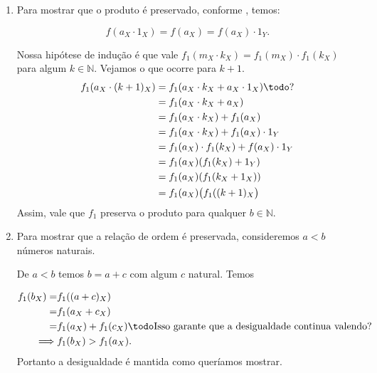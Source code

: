\documentclass[../main.tex]{subfiles}
\begin{document}
\begin{dem}
\begin{enumerate}
\begin{enumerate}
            \item
                Para mostrar que o produto é preservado, conforme , temos:
                
                \[ f(a_X \cdot 1_X) = f(a_X) = f(a_X) \cdot 1_Y. \]
        
                Nossa hipótese de indução é que vale $f_1(m_X \cdot k_X) = f_1(m_X) \cdot f_1(k_X)$ para algum $k \in \mathbb{N}$. Vejamos o que ocorre para $k+1$. \\
        
                \begin{align*}
                    f_1(a_X \cdot (k+1)_X)
                    &= f_1(a_X \cdot k_X + a_X \cdot 1_X) \todoAlign{?} \\
                    &= f_1(a_X \cdot k_X + a_X) \\
                    &= f_1(a_X \cdot k_X) + f_1(a_X) \\
                    &= f_1(a_X \cdot k_X) + f_1(a_X) \cdot 1_Y \\
                    &= f_1(a_X) \cdot f_1(k_X) + f(a_X) \cdot 1_Y \\
                    &= f_1(a_X) (f_1(k_X) + 1_Y) \\
                    &= f_1(a_X) (f_1(k_X + 1_X)) \\
                    &= f_1(a_X) \big( f_1((k+1)_X \big)
                \end{align*}
                Assim, vale que $f_1$ preserva o produto para qualquer $b \in \mathbb{N}$.

            \item Para mostrar que a relação de ordem é preservada, consideremos $a < b$ números naturais.

            De $a < b$ temos $b = a+c$ com algum $c$ natural. Temos

            \begin{align*}
                f_1(b_X) 
                = &f_1((a+c)_X) \\
                = &f_1(a_X + c_X) \\
                = &f_1(a_X) + f_1(c_X) \todoAlign{Isso garante que a desigualdade continua valendo?} \\
                \implies & f_1(b_X) > f_1(a_X).
            \end{align*}
            Portanto a desigualdade é mantida como queríamos mostrar.            
        \end{enumerate}
    

\end{enumerate}
\end{dem}
\end{document}
